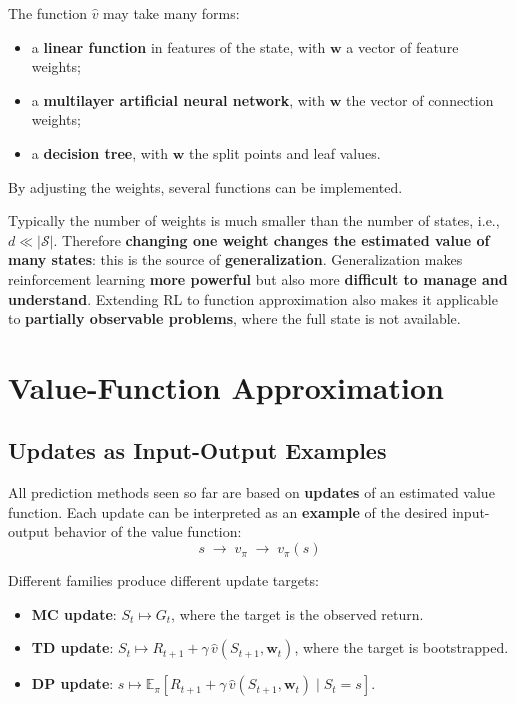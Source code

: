 \documentclass[11pt,a4paper]{article}
\theoremstyle{definition}
\theoremstyle{plain}
\theoremstyle{remark}
\begin{document}
The function $\hat{v}$ may take many forms:
\begin{itemize}
    \item a \textbf{linear function} in features of the state, with $\mathbf{w}$ a vector of feature weights;
    \item a \textbf{multilayer artificial neural network}, with $\mathbf{w}$ the vector of connection weights;
    \item a \textbf{decision tree}, with $\mathbf{w}$ the split points and leaf values.
\end{itemize}
By adjusting the weights, several functions can be implemented.

Typically the number of weights is much smaller than the number of states, i.e., $d \ll |\mathcal{S}|$. Therefore \textbf{changing one weight changes the estimated value of many states}: this is the source of \textbf{generalization}. Generalization makes reinforcement learning \textbf{more powerful} but also more \textbf{difficult to manage and understand}. Extending RL to function approximation also makes it applicable to \textbf{partially observable problems}, where the full state is not available.

\section{Value-Function Approximation}

\subsection{Updates as Input-Output Examples}

All prediction methods seen so far are based on \textbf{updates} of an estimated value function. Each update can be interpreted as an \textbf{example} of the desired input-output behavior of the value function:
\[
    s \;\longrightarrow\; \boxed{v_\pi} \;\longrightarrow\; v_\pi(s)
\]

Different families produce different update targets:
\begin{itemize}
    \item \textbf{MC update}: $S_t \mapsto G_t$, where the target is the observed return.
    \item \textbf{TD update}: $S_t \mapsto R_{t+1} + \gamma\, \hat{v}(S_{t+1}, \mathbf{w}_t)$, where the target is bootstrapped.
    \item \textbf{DP update}: $s \mapsto \mathbb{E}_\pi\!\left[R_{t+1} + \gamma\, \hat{v}(S_{t+1}, \mathbf{w}_t) \mid S_t = s\right]$.
\end{itemize}
\end{document}
